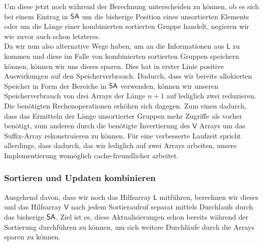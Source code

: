 Um diese jetzt noch während der Berechnung unterscheiden zu können, ob es sich bei einem Eintrag in $\sa$ um die bisherige Position eines unsortierten Elements oder um die Länge einer kombinierten sortierten Gruppe handelt, negieren wir wie zuvor auch schon letzteres.\\
Da wir nun also alternative Wege haben, um an die Informationen aus $\mathsf{L}$ zu kommen und diese im Falle von kombinierten sortierten Gruppen speichern können, können wir uns dieses sparen. Dies hat in erster Linie positive Auswirkungen auf den Speicherverbrauch. Dadurch, dass wir bereits allokierten Speicher in Form der Bereiche in $\sa$ verwenden, können wir unseren Speicherverbrauch von drei Arrays der Länge $n+1$ auf lediglich zwei reduzieren. Die benötigten Rechenoperationen erhöhen sich dagegen. Zum einen dadurch, dass das Ermitteln der Länge unsortierter Gruppen mehr Zugriffe als vorher benötigt, zum anderen durch die benötigte Invertierung des $\mathsf{V}$ Arrays um das Suffix-Array rekonstruieren zu können. Für eine verbesserte Laufzeit spricht allerdings, dass dadurch, das wir lediglich auf zwei Arrays arbeiten, unsere Implementierung womöglich cache-freundlicher arbeitet.
\subsubsection{Sortieren und Updaten kombinieren}
Ausgehend davon, dass wir noch das Hilfsarray $\mathsf{L}$ mitführen, berechnen wir dieses und das Hilfsarray $\mathsf{V}$ nach jedem Sortieraufruf separat mittels Durchlaufs durch das bisherige $\sa$. Ziel ist es, diese Aktualisierungen schon bereits während der Sortierung durchführen zu können, um sich weitere Durchläufe durch die Arrays sparen zu können. 

